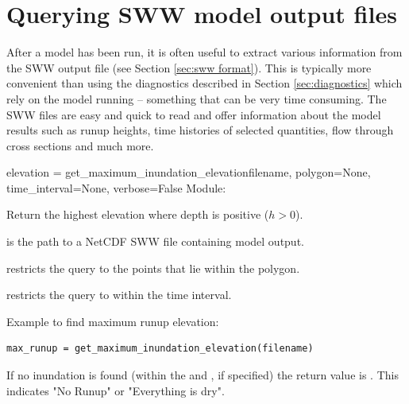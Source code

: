 \documentclass{manual}
\begin{document}
\chapter{Querying SWW model output files}

After a model has been run, it is often useful to extract various information from the SWW
output file (see Section \ref{sec:sww format}). This is typically more convenient than using the
diagnostics described in Section \ref{sec:diagnostics} which rely on the model running -- something
that can be very time consuming. The SWW files are easy and quick to read and offer information
about the model results such as runup heights, time histories of selected quantities,
flow through cross sections and much more.

\begin{funcdesc}{elevation = get_maximum_inundation_elevation}{filename,
                                     polygon=None,
                                     time_interval=None,
                                     verbose=False}
Module: 

Return the highest elevation where depth is positive ($h > 0$).

 is the path to a NetCDF SWW file containing \anuga model output.

 restricts the query to the points that lie within the polygon.

 restricts the query to within the time interval.

Example to find maximum runup elevation:

\begin{verbatim}
max_runup = get_maximum_inundation_elevation(filename)
\end{verbatim}

If no inundation is found (within the  and , if specified)
the return value is . This indicates "No Runup" or "Everything is dry".
\end{funcdesc}
\end{document}
